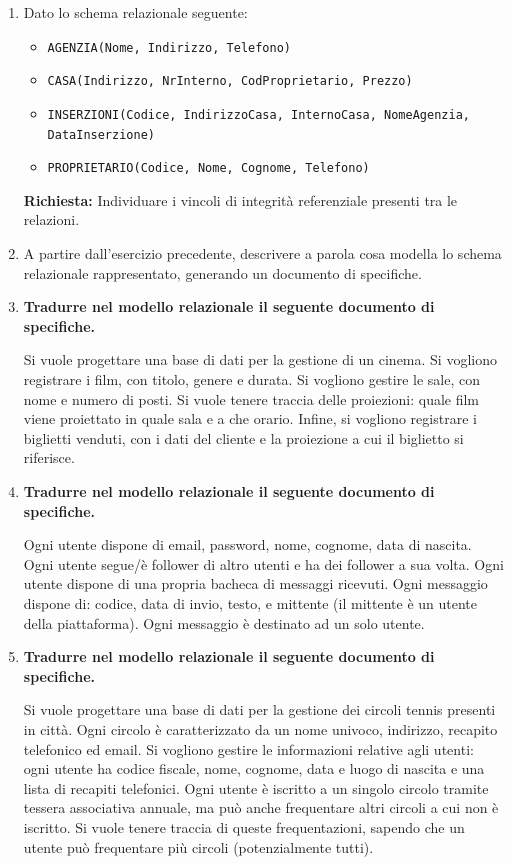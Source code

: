 \documentclass[a4paper,12pt]{article}
\begin{document}
\begin{enumerate}
\item 

Dato lo schema relazionale seguente:

\begin{itemize}
    \item \texttt{AGENZIA(Nome, Indirizzo, Telefono)}
    \item \texttt{CASA(Indirizzo, NrInterno, CodProprietario, Prezzo)}
    \item \texttt{INSERZIONI(Codice, IndirizzoCasa, InternoCasa, NomeAgenzia, DataInserzione)}
    \item \texttt{PROPRIETARIO(Codice, Nome, Cognome, Telefono)}
\end{itemize}

\textbf{Richiesta:} Individuare i vincoli di integrità referenziale presenti tra le relazioni.


\item A partire dall'esercizio precedente, descrivere a parola cosa modella lo schema relazionale rappresentato, generando un documento di specifiche.


\item \textbf{Tradurre nel modello relazionale il seguente documento di
specifiche.}

Si vuole progettare una base di dati per la gestione di un cinema.
Si vogliono registrare i film, con titolo, genere e durata.
Si vogliono gestire le sale, con nome e numero di posti.
Si vuole tenere traccia delle proiezioni: quale film viene proiettato in quale sala e a che orario.
Infine, si vogliono registrare i biglietti venduti, con i dati del cliente e la proiezione a cui il biglietto si riferisce.


\item \textbf{Tradurre nel modello relazionale il seguente documento di specifiche.}

Ogni utente dispone di email, password, nome, cognome, data di nascita. Ogni utente segue/è follower di altro utenti e ha dei follower a sua volta. Ogni utente dispone di una propria bacheca di messaggi ricevuti. Ogni messaggio dispone di: codice, data di invio, testo, e mittente (il mittente è un utente della piattaforma). Ogni messaggio è destinato ad un solo utente.


\item \textbf{Tradurre nel modello relazionale il seguente documento di specifiche.}

Si vuole progettare una base di dati per la gestione dei circoli tennis presenti in città.
Ogni circolo è caratterizzato da un nome univoco, indirizzo, recapito telefonico ed email.
Si vogliono gestire le informazioni relative agli utenti: ogni utente ha codice fiscale, nome, cognome, data e luogo di nascita e una lista di recapiti telefonici.
Ogni utente è iscritto a un singolo circolo tramite tessera associativa annuale, ma può anche frequentare altri circoli a cui non è iscritto.
Si vuole tenere traccia di queste frequentazioni, sapendo che un utente può frequentare più circoli (potenzialmente tutti).


\end{enumerate}
\end{document}
